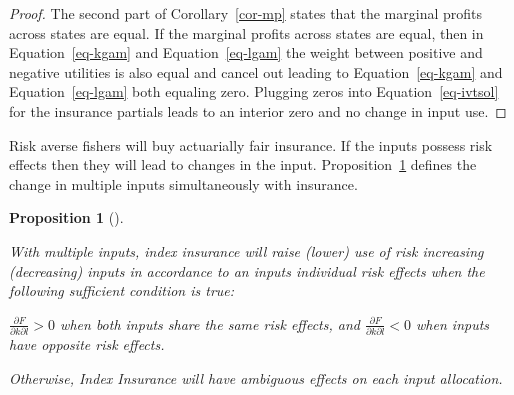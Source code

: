 \documentclass[
  letterpaper,
  DIV=11,
  numbers=noendperiod]{scrartcl}
\theoremstyle{plain}
\newtheorem{proposition}{Proposition}[section]
\theoremstyle{plain}
\theoremstyle{remark}
\begin{document}
\begin{proof}

The second part of Corollary~\ref{cor-mp} states that the marginal
profits across states are equal. If the marginal profits across states
are equal, then in Equation~\ref{eq-kgam} and Equation~\ref{eq-lgam} the
weight between positive and negative utilities is also equal and cancel
out leading to Equation~\ref{eq-kgam} and Equation~\ref{eq-lgam} both
equaling zero. Plugging zeros into Equation~\ref{eq-ivtsol} for the
insurance partials leads to an interior zero and no change in input use.

\end{proof}

Risk averse fishers will buy actuarially fair insurance. If the inputs
possess risk effects then they will lead to changes in the input.
Proposition~\ref{prp-samre} defines the change in multiple inputs
simultaneously with insurance.

\begin{proposition}[]\protect\hypertarget{prp-samre}{}\label{prp-samre}

With multiple inputs, index insurance will raise (lower) use of risk
increasing (decreasing) inputs in accordance to an inputs individual
risk effects when the following sufficient condition is true:

\(\frac{\partial F}{\partial k\partial l}>0\) when both inputs share the
same risk effects, and \(\frac{\partial F}{\partial k\partial l}<0\)
when inputs have opposite risk effects.

Otherwise, Index Insurance will have ambiguous effects on each input
allocation.

\end{proposition}
\end{document}
